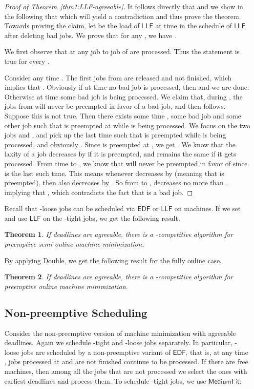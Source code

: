 \documentclass[letterpaper,11pt]{article}
\newtheorem{theorem}{Theorem}
\newcommand{\EDF}{\ensuremath{\mathsf{EDF}}\xspace}
\newcommand{\LLF}{\ensuremath{\mathsf{LLF}}\xspace}
\newcommand{\Mediumfit}{\ensuremath{\mathsf{MediumFit}}\xspace}
\newcommand{\double}{{\sf Double}\xspace}
\begin{document}
\begin{proof}[Proof of Theorem~\ref{thm1:LLF-agreeable}]
It follows directly that  and we show in the following that  which will yield a contradiction and thus prove the theorem. Towards proving the claim, let  be the load of \LLF at time  in the schedule of \LLF after deleting bad jobs. We prove that for any , we have .

We first observe that at any  job  to job  of  are processed. Thus the statement is true for every .

Consider any time . The first  jobs from  are released and not finished, which implies that . Obviously if at time  no bad job is processed, then  and we are done. 
Otherwise at time  some bad job is being processed. We claim that, during , the jobs  from  will never be preempted in favor of a bad job, and then  follows. Suppose this is not true. Then there exists some time , some bad job  and some other job  such that  is preempted at  while  is being processed. We focus on the two jobs  and , and pick up the last time  such that  is preempted while  is being processed, and obviously . Since  is preempted at , we get . We know that the laxity of a job decreases by  if it is preempted, and remains the same if it gets processed. From time  to , we know that  will never be preempted in favor of  since  is the last such time. This means whenever  decreases by  (meaning that  is preempted), then  also decreases by . So from  to ,  decreases no more than , implying that , which contradicts the fact that  is a bad job.
\end{proof}

Recall that -loose jobs can be scheduled via \EDF or \LLF on  machines. If we set  and use \LLF on the -tight jobs, we get the following result.

\begin{theorem}
  If deadlines are agreeable, there is a -competitive algorithm for preemptive semi-online machine minimization.
\end{theorem}

By applying \double, we get the following result for the fully online case.

\begin{theorem}
  If deadlines are agreeable, there is a -competitive algorithm for preemptive online machine minimization.
\end{theorem}

\subsection{Non-preemptive Scheduling} Consider the non-preemptive version of machine minimization with agreeable deadlines. Again we schedule -tight and -loose jobs separately. In particular, -loose jobs are scheduled by a non-preemptive variant of \EDF, that is, at any time , jobs processed at  and are not finished continue to be processed. If there are free machines, then among all the jobs that are not processed we select the ones with earliest deadlines and process them. To schedule -tight jobs, we use \Mediumfit:
\end{document}
